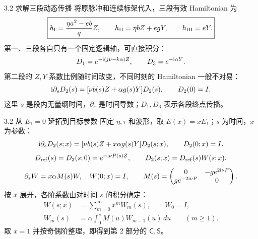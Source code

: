 \documentclass[aspectratio=169,11pt]{beamer}
\begin{document}
\begin{frame}[t]{3.2 求解三段动态传播}
  将原脉冲和连续标架代入，三段有效 Hamiltonian 为
  \[
    \boxed{
    h_{\rm I}=\frac{\eta a^2-eb}{q}Z,\qquad
    h_{\rm II}=\eta bZ+egY,\qquad h_{\rm III}=eY.}
  \]
  第一、三段各自只有一个固定逻辑轴，可直接积分：
  \[
    D_1=e^{-\mathrm{i}(j\nu-k\alpha)Z},\qquad D_3=e^{-\mathrm{i}\alpha Y}.
  \]
  第二段的 $Z,Y$ 系数比例随时间改变，不同时刻的 Hamiltonian 一般不对易：
  \[
    \mathrm{i}\partial_s D_2(s)=[\nu b(s)Z+\alpha g(s)Y]D_2(s),\qquad D_2(0)=I.
  \]
  \small 这里 $s$ 是段内无量纲时间，$\partial_s$ 是时间导数；$D_1,D_3$ 表示各段终点传播。
  \vspace{.15cm}
\end{frame}

\begin{frame}[t]{3.2 从 $E_1=0$ 延拓到目标参数}
  \small
  \setlength{\abovedisplayskip}{5pt}\setlength{\belowdisplayskip}{5pt}
  固定 $\eta,\tau$ 和波形，取 $E(x)=xE_1$；$s$ 为时间，$x$ 为参数：
  \[
    \mathrm{i}\partial_sD_2(s;x)=[\nu b(s)Z+x\alpha g(s)Y]D_2(s;x),\qquad D_2(0;x)=I.
  \]
  \[
    D_{\rm ref}(s)=D_2(s;0)=e^{-\mathrm{i}\nu P(s)Z},\qquad
    D_2(s;x)=D_{\rm ref}(s)W(s;x).
  \]
  \[
    \partial_sW=x\alpha M(s)W,\quad W(0;x)=I,\qquad
    M(s)=\begin{pmatrix}0&-g e^{2\mathrm{i}\nu P}\\g e^{-2\mathrm{i}\nu P}&0\end{pmatrix}.
  \]
  按 $x$ 展开，各阶系数由对时间 $s$ 的积分确定：
  \[
    \begin{aligned}
      W(s;x)&=\sum_{m=0}^{\infty}x^m W_m(s),\qquad W_0=I,\\
      W_m(s)&=\alpha\int_0^s M(u)W_{m-1}(u)\,du\qquad(m\ge1).
    \end{aligned}
  \]
  取 $x=1$ 并按奇偶阶整理，即得到第 2 部分的 $\mathsf C,\mathsf S$。
\end{frame}
\end{document}
